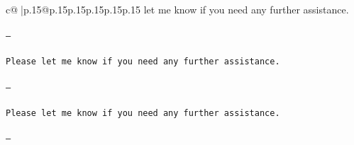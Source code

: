 \documentclass{article}
\begin{document}
{\begin{supertabular}{c@{$\;$}|p{.15\linewidth}@{}p{.15\linewidth}p{.15\linewidth}p{.15\linewidth}p{.15\linewidth}p{.15\linewidth}}
{{{ let me know if you need any further assistance. \\ \tt \\ \tt ---\\ \tt \\ \tt Please let me know if you need any further assistance. \\ \tt \\ \tt ---\\ \tt \\ \tt Please let me know if you need any further assistance. \\ \tt \\ \tt ---\\ }}}
\end{supertabular}}
\end{document}
